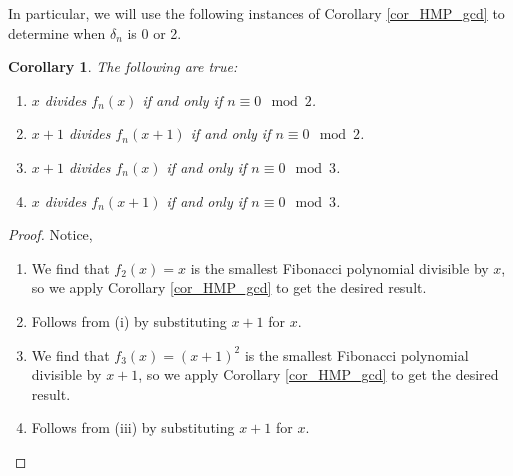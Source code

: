 \documentclass[a4paper]{article}
\newtheorem{corollary}{Corollary}[theorem]
\begin{document}
	In particular, we will use the following instances of Corollary \ref{cor_HMP_gcd} to determine when $\delta_n$ is 0 or 2.
	
	\begin{corollary}\label{cor_cor_HMP_gcd}
		The following are true:
		\begin{enumerate}[label=(\roman*)]
			\item $x$ divides $f_n(x)$ if and only if $n \equiv 0 \mod 2$.
			\item $x+1$ divides $f_n(x+1)$ if and only if $n \equiv 0 \mod 2$.
			\item $x+1$ divides $f_n(x)$ if and only if $n \equiv 0 \mod 3$.
			\item $x$ divides $f_n(x+1)$ if and only if $n \equiv 0 \mod 3$.
		\end{enumerate}
	\end{corollary}
	\begin{proof}
		Notice,
		\begin{enumerate}[label=(\roman*)]
			\item
				We find that $f_2(x) = x$ is the smallest Fibonacci polynomial divisible by $x$, so we apply Corollary \ref{cor_HMP_gcd} to get the desired result.
			\item
				Follows from (i) by substituting $x+1$ for $x$.
			\item
				We find that $f_3(x) = (x+1)^2$ is the smallest Fibonacci polynomial divisible by $x+1$, so we apply Corollary \ref{cor_HMP_gcd} to get the desired result.
			\item
				Follows from (iii) by substituting $x+1$ for $x$.
		\end{enumerate}
	\end{proof}
\end{document}
